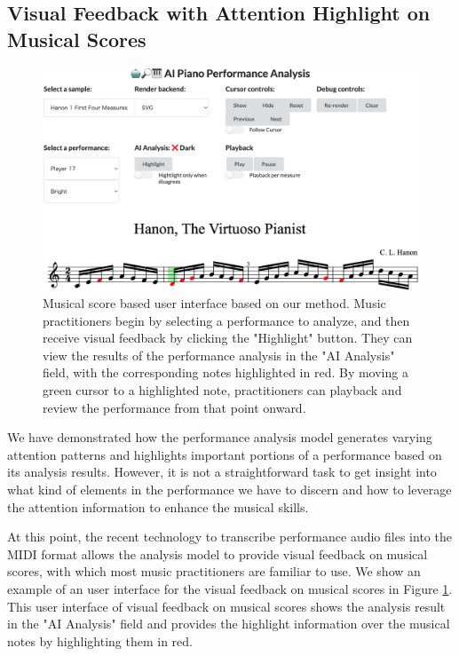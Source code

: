 \subsection{Visual Feedback with Attention Highlight on Musical Scores} \label{visualization_score}
\begin{figure}[h!]
  \centering
  \includegraphics[width=\linewidth]{figures/UI_v110.png}
  \caption{Musical score based user interface based on our method. Music practitioners begin by selecting a performance to analyze, and then receive visual feedback by clicking the "Highlight" button. They can view the results of the performance analysis in the "AI Analysis" field, with the corresponding notes highlighted in red. By moving a green cursor to a highlighted note, practitioners can playback and review the performance from that point onward.}
  \Description{}
  \label{UI}
\end{figure}

We have demonstrated how the performance analysis model generates varying attention patterns and highlights important portions of a performance based on its analysis results. 
However, it is not a straightforward task to get insight into what kind of elements in the performance we have to discern and how to leverage the attention information to enhance the musical skills.

At this point, the recent technology to transcribe performance audio files into the MIDI format \cite{hawthorne2021, gardner2022} allows the analysis model to provide visual feedback on musical scores, with which most music practitioners are familiar to use.
We show an example of an user interface for the visual feedback on musical scores in Figure \ref{UI}.
This user interface of visual feedback on musical scores shows the analysis result in the "AI Analysis" field and provides the highlight information over the musical notes by highlighting them in red.

